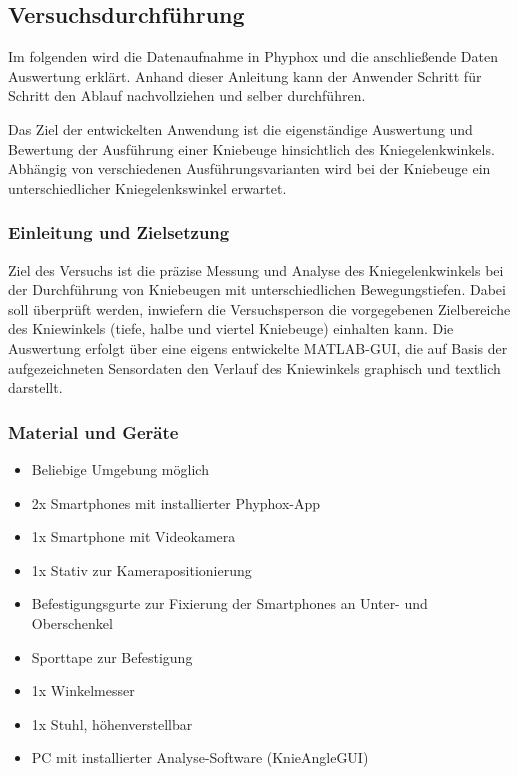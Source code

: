 \subsection{Versuchsdurchführung}
\noindent Im folgenden wird die Datenaufnahme in Phyphox und die anschließende Daten Auswertung erklärt. Anhand dieser Anleitung kann der Anwender Schritt für Schritt den Ablauf nachvollziehen und selber durchführen.

\noindent Das Ziel der entwickelten Anwendung ist die eigenständige Auswertung und Bewertung der Ausführung einer Kniebeuge hinsichtlich des Kniegelenkwinkels. Abhängig von verschiedenen Ausführungsvarianten wird bei der Kniebeuge ein unterschiedlicher Kniegelenkswinkel erwartet. 

\subsubsection{Einleitung und Zielsetzung}
Ziel des Versuchs ist die präzise Messung und Analyse des Kniegelenkwinkels bei der Durchführung von Kniebeugen mit unterschiedlichen Bewegungstiefen. Dabei soll überprüft werden, inwiefern die Versuchsperson die vorgegebenen Zielbereiche des Kniewinkels (tiefe, halbe und viertel Kniebeuge) einhalten kann. Die Auswertung erfolgt über eine eigens entwickelte MATLAB-GUI, die auf Basis der aufgezeichneten Sensordaten den Verlauf des Kniewinkels graphisch und textlich darstellt.

\subsubsection{Material und Geräte}
\begin{itemize}
    \item Beliebige Umgebung möglich
    \item 2x Smartphones mit installierter Phyphox-App
    \item 1x Smartphone mit Videokamera
    \item 1x Stativ zur Kamerapositionierung
    \item Befestigungsgurte zur Fixierung der Smartphones an Unter- und Oberschenkel
    \item Sporttape zur Befestigung
    \item 1x Winkelmesser
    \item 1x Stuhl, höhenverstellbar
    \item PC mit installierter Analyse-Software (KnieAngleGUI)
\end{itemize}

